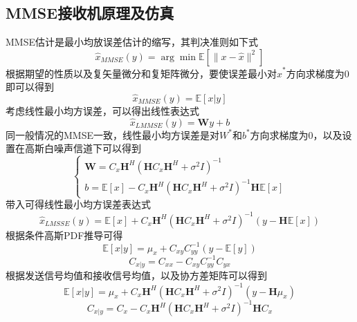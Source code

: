 \documentclass[bachelor,nocolorlinks, printoneside]{seuthesis} %
\begin{document}
\begin{Main}
\section{MMSE接收机原理及仿真}
MMSE估计是最小均放误差估计的缩写，其判决准则如下式
\begin{equation}\label{key}
\hat{x}_{MMSE}(y) = \arg \min \mathbb{E}[\| x - \hat{x} \|^{2}]
\end{equation}
根据期望的性质以及复矢量微分和复矩阵微分，要使误差最小对$\hat{x}^{*}$方向求梯度为0即可以得到
\begin{equation}\label{key}
\hat{x}_{MMSE}(y) = \mathbb{E}[x|y]
\end{equation}
考虑线性最小均方误差，可以得出线性表达式
\begin{equation}\label{key}
\hat{x}_{LMMSE}(y)=\mathbf{W}y+b
\end{equation}
同一般情况的MMSE一致，线性最小均方误差是对$W^{*}$和$b^{*}$方向求梯度为0，以及设置在高斯白噪声信道下可以得到
\begin{equation}\label{key}
\left\{
\begin{array}{l}
\mathbf{W}=C_{x}\mathbf{H}^{H}(\mathbf{H}C_{x}\mathbf{H}^{H} + \sigma^{2}I)^{-1} \\
b=\mathbb{E}[x] - C_{x}\mathbf{H}^{H}(\mathbf{H}C_{x}\mathbf{H}^{H} + \sigma^{2}I)^{-1}\mathbf{H}\mathbb{E}[x]
\end{array}
\right.
\end{equation}
带入可得线性最小均方误差表达式
\begin{equation}\label{key}
\hat{x}_{LMSSE}(y)=\mathbb{E}[x]+C_{x}\mathbf{H}^{H}(\mathbf{H}C_{x}\mathbf{H}^{H}+\sigma^{2}I)^{-1}(y-\mathbf{H}\mathbb{E}[x])
\end{equation}
根据条件高斯PDF推导可得
\begin{equation}\label{key}
\mathbb{E}[x|y]=\mu_{x}+C_{xy}C_{yy}^{-1}(y-\mathbb{E}[y])
\end{equation}
\begin{equation}\label{key}
C_{x|y} = C_{xx} -C_{xy}C_{yy}^{-1}C_{yx}
\end{equation}
根据发送信号均值和接收信号均值，以及协方差矩阵可以得到
\begin{equation}\label{key}
\mathbb{E}[x|y]=\mu_{x} + C_{x}\mathbf{H}^{H}(\mathbf{H}C_{x}\mathbf{H}^{H}+\sigma^{2}I)^{-1}(y-\mathbf{H}\mu_{x})
\end{equation}
\begin{equation}\label{key}
C_{x|y}=C_{x}-C_{x}\mathbf{H}^{H}(\mathbf{H}C_{x}\mathbf{H}^{H}+\sigma^{2}I)^{-1}\mathbf{H}C_{x}
\end{equation}

\end{Main}
\end{document}
